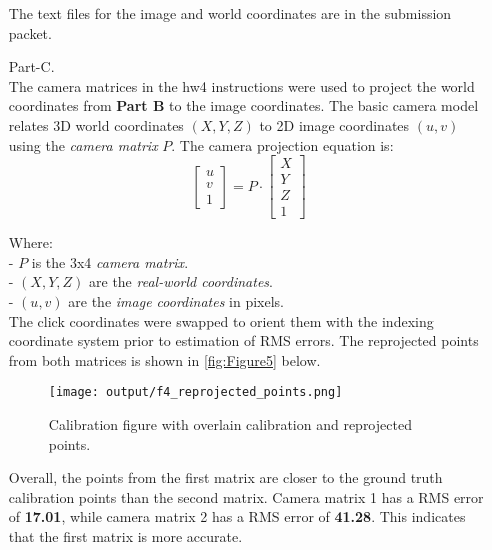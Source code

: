 \documentclass[12pt]{report}
\begin{document}
\begin{enumerate}
    \FloatBarrier 

    The text files for the image and world coordinates are in the submission packet.

    \item[Part-C.]
    \ \\
    The camera matrices in the hw4 instructions were used to project the world coordinates from \textbf{Part B} to the image coordinates. The basic 
    camera model relates 3D world coordinates \((X, Y, Z)\) to 2D image coordinates \((u, v)\) using the \textit{camera matrix} \(P\). The camera projection 
    equation is:
    \[
    \begin{bmatrix}
        u \\
        v \\
        1
    \end{bmatrix}
    =
    P \cdot
    \begin{bmatrix}
        X \\
        Y \\
        Z \\
        1
    \end{bmatrix}
    \]

    Where:  \\
    - \(P\) is the 3x4 \textit{camera matrix}.\\
    - \((X, Y, Z)\) are the \textit{real-world coordinates}.\\
    - \((u, v)\) are the \textit{image coordinates} in pixels.\\
    
    The click coordinates were swapped to orient them with the indexing coordinate system prior to estimation of RMS errors. The reprojected points from 
    both matrices is shown in \autoref{fig:Figure5} below.

    \begin{figure}[H]
        \centering
        \texttt{[image: output/f4\_reprojected\_points.png]}
        \caption{Calibration figure with overlain calibration and reprojected points.}
        \label{fig:Figure5}
    \end{figure}

    \FloatBarrier 

    Overall, the points from the first matrix are closer to the ground truth calibration points than the second matrix. Camera matrix 1 has a RMS error of \textbf{17.01}, 
    while camera matrix 2 has a RMS error of \textbf{41.28}. This indicates that the first matrix is more accurate. 



\end{enumerate}
\end{document}
